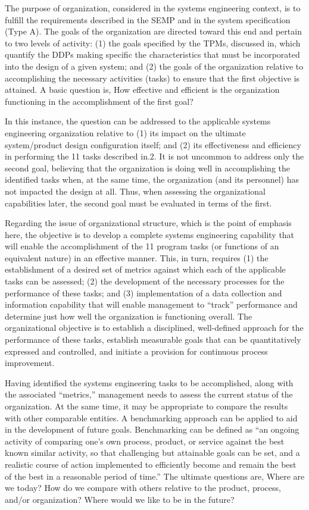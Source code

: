 The purpose of organization, considered in the systems engineering context, is to fulfill the requirements described in the SEMP and in the system specification (Type A). The goals of the organization are directed toward this end and pertain to two levels of activity: (1) the goals specified by the TPMs, discussed in, which quantify the DDPs making specific the characteristics that must be incorporated into the design of a given system; and (2) the goals of the organization relative to accomplishing the necessary activities (tasks) to ensure that the first objective is attained. A basic question is, How effective and efficient is the organization functioning in the accomplishment of the first goal?

In this instance, the question can be addressed to the applicable systems engineering organization relative to (1) its impact on the ultimate system/product design configuration itself; and (2) its effectiveness and efficiency in performing the 11 tasks described in.2. It is not uncommon to address only the second goal, believing that the organization is doing well in accomplishing the identified tasks when, at the same time, the organization (and its personnel) has not impacted the design at all. Thus, when assessing the organizational capabilities later, the second goal must be evaluated in terms of the first.

Regarding the issue of organizational structure, which is the point of emphasis here, the objective is to develop a complete systems engineering capability that will enable the accomplishment of the 11 program tasks (or functions of an equivalent nature) in an effective manner. This, in turn, requires (1) the establishment of a desired set of metrics against which each of the applicable tasks can be assessed; (2) the development of the necessary processes for the performance of these tasks; and (3) implementation of a data collection and information capability that will enable management to “track” performance and determine just how well the organization is functioning overall. The organizational objective is to establish a disciplined, well-defined approach for the performance of these tasks, establish measurable goals that can be quantitatively expressed and controlled, and initiate a provision for continuous process improvement.

Having identified the systems engineering tasks to be accomplished, along with the associated ``metrics,'' management needs to assess the current status of the organization. At the same time, it may be appropriate to compare the results with other comparable entities. A benchmarking approach can be applied to aid in the development of future goals. Benchmarking can be defined as ``an ongoing activity of comparing one’s own process, product, or service against the best known similar activity, so that challenging but attainable goals can be set, and a realistic course of action implemented to efficiently become and remain the best of the best in a reasonable period of time.'' The ultimate questions are, Where are we today? How do we compare with others relative to the product, process, and/or organization? Where would we like to be in the future?


